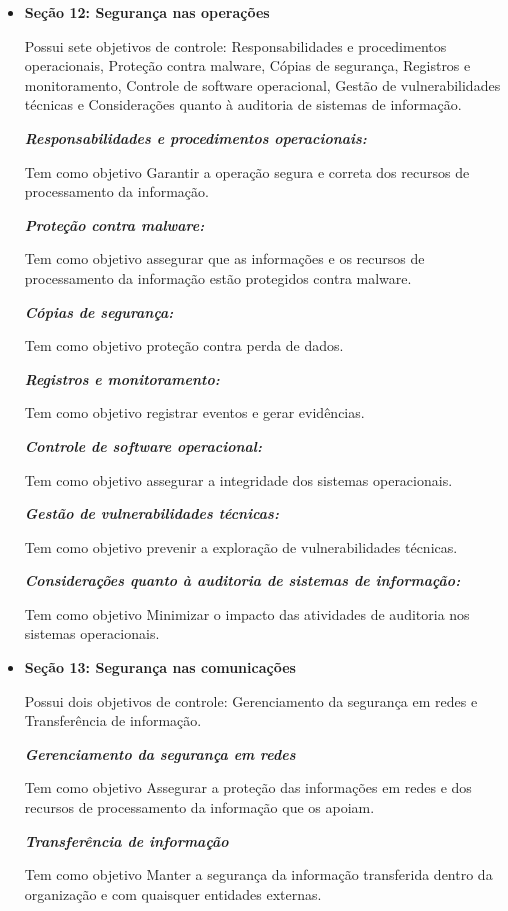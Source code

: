 \begin{itemize}
    \item \textbf{Seção 12: Segurança nas operações}
    
    Possui sete objetivos de controle: Responsabilidades e procedimentos operacionais, Proteção contra malware, Cópias de segurança, Registros e monitoramento, Controle de software operacional, Gestão de vulnerabilidades técnicas e Considerações quanto à auditoria de sistemas de informação.
    
  \textit{  \textbf{Responsabilidades e procedimentos operacionais:}}
    
    Tem como objetivo Garantir a operação segura e correta dos recursos de processamento da informação.
    
  \textit{  \textbf{Proteção contra malware:}}
    
    Tem como objetivo assegurar que as informações e os recursos de processamento da informação
estão protegidos contra malware.
    
   \textit{ \textbf{Cópias de segurança:}}
    
    Tem como objetivo proteção contra perda de dados.
    
   \textit{ \textbf{Registros e monitoramento:}}
    
    Tem como objetivo registrar eventos e gerar evidências.
    
    \textit{\textbf{Controle de software operacional:}}
    
    Tem como objetivo assegurar a integridade dos sistemas operacionais.
    
    \textit{\textbf{Gestão de vulnerabilidades técnicas:}}
    
    Tem como objetivo prevenir a exploração de vulnerabilidades técnicas.
    
  \textit{  \textbf{Considerações quanto à auditoria de sistemas de informação:}}

     Tem como objetivo Minimizar o impacto das atividades de auditoria nos sistemas operacionais.
\end{itemize}
\begin{itemize}
    \item \textbf{Seção 13: Segurança nas comunicações }
    
    Possui dois objetivos de controle: Gerenciamento da segurança em redes e Transferência de informação.
    
    \textit{ \textbf{Gerenciamento da segurança em redes}}
    
     Tem como objetivo Assegurar a proteção das informações em redes e dos recursos de processamento da informação que os apoiam.

    \textit{ \textbf{Transferência de informação}}
    
     Tem como objetivo Manter a segurança da informação transferida dentro da organização e com
quaisquer entidades externas.
    
\end{itemize}
